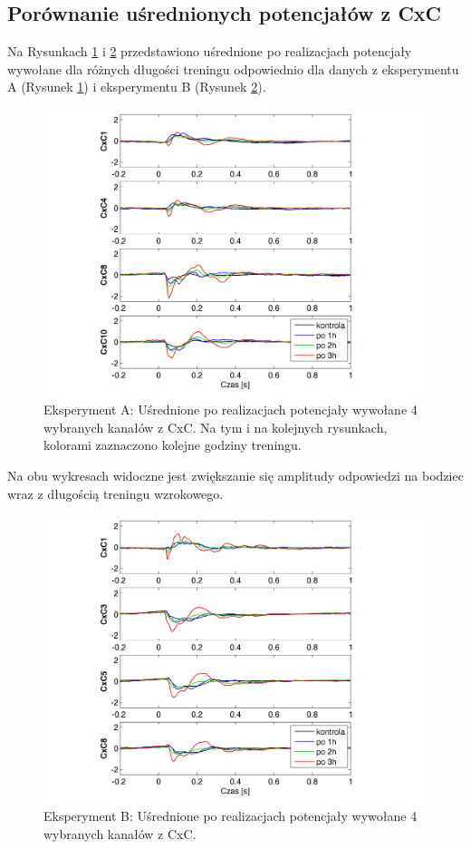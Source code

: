 \documentclass{pracamgr}
\begin{document}
	\subsection{Porównanie uśrednionych potencjałów z CxC}
	Na Rysunkach \ref{rys:kontrola15_CxC} i \ref{rys:beta3_CxC} przedstawiono uśrednione po realizacjach potencjały wywołane dla różnych długości treningu odpowiednio dla danych z eksperymentu A (Rysunek \ref{rys:kontrola15_CxC}) i eksperymentu B (Rysunek \ref{rys:beta3_CxC}).
	\begin{figure}[htbp]
		\begin{center}
			\includegraphics[scale=0.8]{kontrola15_CxC.png}
		\end{center}
		\caption{Eksperyment A: Uśrednione po realizacjach potencjały wywołane 4 wybranych kanałów z CxC. Na tym i na kolejnych rysunkach, kolorami zaznaczono kolejne godziny treningu.}
		\label{rys:kontrola15_CxC}
	\end{figure}
	\FloatBarrier
	Na obu wykresach widoczne jest zwiększanie się amplitudy odpowiedzi na bodziec wraz z długością treningu wzrokowego.
	\begin{figure}[h]
		\begin{center}
			\includegraphics[scale=0.8]{beta3_CxC.png}
		\end{center}
		\caption{Eksperyment B: Uśrednione po realizacjach potencjały wywołane 4 wybranych kanałów z CxC.}
		\label{rys:beta3_CxC}
	\end{figure}
\end{document}
